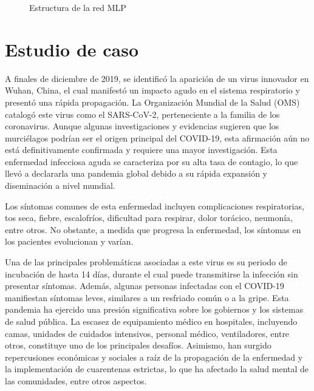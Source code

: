 \documentclass[
  letterpaper,
  DIV=11,
  numbers=noendperiod]{scrreport}
\theoremstyle{plain}
\theoremstyle{definition}
\theoremstyle{definition}
\theoremstyle{plain}
\theoremstyle{remark}
\begin{document}
\begin{figure}


\caption{\label{fig-estmlp}Estructura de la red MLP}

\end{figure}%

\subsection*{}\label{section}

\part{Estudio de caso}

A finales de diciembre de 2019, se identificó la aparición de un virus
innovador en Wuhan, China, el cual manifestó un impacto agudo en el
sistema respiratorio y presentó una rápida propagación. La Organización
Mundial de la Salud (OMS) catalogó este virus como el SARS-CoV-2,
perteneciente a la familia de los coronavirus. Aunque algunas
investigaciones y evidencias sugieren que los murciélagos podrían ser el
origen principal del COVID-19, esta afirmación aún no está
definitivamente confirmada y requiere una mayor investigación. Esta
enfermedad infecciosa aguda se caracteriza por su alta tasa de contagio,
lo que llevó a declararla una pandemia global debido a su rápida
expansión y diseminación a nivel mundial.

Los síntomas comunes de esta enfermedad incluyen complicaciones
respiratorias, tos seca, fiebre, escalofríos, dificultad para respirar,
dolor torácico, neumonía, entre otros. No obstante, a medida que
progresa la enfermedad, los síntomas en los pacientes evolucionan y
varían.

Una de las principales problemáticas asociadas a este virus es su
periodo de incubación de hasta 14 días, durante el cual puede
transmitirse la infección sin presentar síntomas. Además, algunas
personas infectadas con el COVID-19 manifiestan síntomas leves,
similares a un resfriado común o a la gripe. Esta pandemia ha ejercido
una presión significativa sobre los gobiernos y los sistemas de salud
pública. La escasez de equipamiento médico en hospitales, incluyendo
camas, unidades de cuidados intensivos, personal médico, ventiladores,
entre otros, constituye uno de los principales desafíos. Asimismo, han
surgido repercusiones económicas y sociales a raíz de la propagación de
la enfermedad y la implementación de cuarentenas estrictas, lo que ha
afectado la salud mental de las comunidades, entre otros aspectos.
\end{document}
